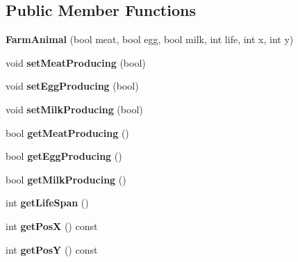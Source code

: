 \subsection*{Public Member Functions}
\begin{DoxyCompactItemize}
\item 
\mbox{\label{class_farm_animal_ad45a3093f80ad488e078d5265b0bbdcf}} 
{\bfseries Farm\+Animal} (bool meat, bool egg, bool milk, int life, int x, int y)
\item 
\mbox{\label{class_farm_animal_acf5e002222c91fc0e735d22021f9c25d}} 
void {\bfseries set\+Meat\+Producing} (bool)
\item 
\mbox{\label{class_farm_animal_a41eb5889b024e6b4b6b34b3d26d1d655}} 
void {\bfseries set\+Egg\+Producing} (bool)
\item 
\mbox{\label{class_farm_animal_a0505a603f5d66438e24aa5edb7c58d2c}} 
void {\bfseries set\+Milk\+Producing} (bool)
\item 
\mbox{\label{class_farm_animal_a9c34ee38fe16b9d5ed68ceaf7bc46910}} 
bool {\bfseries get\+Meat\+Producing} ()
\item 
\mbox{\label{class_farm_animal_a15bce6561b72404291e8d25f11f6ed86}} 
bool {\bfseries get\+Egg\+Producing} ()
\item 
\mbox{\label{class_farm_animal_a779a8b34eec5df21ccf2e12a95e626b1}} 
bool {\bfseries get\+Milk\+Producing} ()
\item 
\mbox{\label{class_farm_animal_a5481b182a18d6ca3beb54a041c97b650}} 
int {\bfseries get\+Life\+Span} ()
\item 
\mbox{\label{class_farm_animal_a7ac2e4bc2866d34ecc90d6b55c9f241d}} 
int {\bfseries get\+PosX} () const
\item 
\mbox{\label{class_farm_animal_aed372508003c3458067758a2a0a090aa}} 
int {\bfseries get\+PosY} () const
\item 
\mbox{\label{class_farm_animal_aa94faebfc5441943e48fe2caca6d5749}} 

\end{DoxyCompactItemize}
